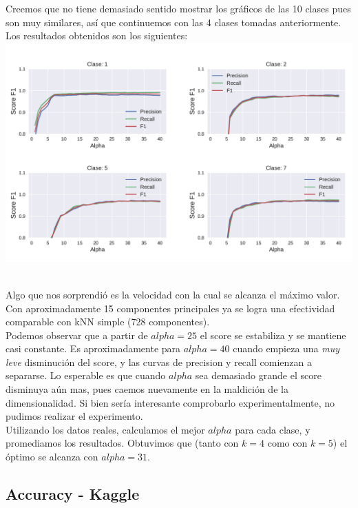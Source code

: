 Creemos que no tiene demasiado sentido mostrar los gráficos de las 10 clases pues son muy similares, así que continuemos con las 4 clases tomadas anteriormente. Los resultados obtenidos son los siguientes: \\

{\centering
    \includegraphics[scale=0.65]{informe/imagenes/pca/variacionAlphaClases1257KFijo.pdf} \\
}
$ $\newline

Algo que nos sorprendió es la velocidad con la cual se alcanza el máximo valor. Con aproximadamente 15 componentes principales ya se logra una efectividad comparable con kNN simple (728 componentes). \\

Podemos observar que a partir de $alpha=25$ el score se estabiliza y se mantiene casi constante. Es aproximadamente para $alpha=40$ cuando empieza una \textit{muy leve} disminución del score, y las curvas de precision y recall comienzan a separarse. Lo esperable es que cuando $alpha$ sea demasiado grande el score disminuya aún mas, pues caemos nuevamente en la maldición de la dimensionalidad. Si bien sería interesante comprobarlo experimentalmente, no pudimos realizar el experimento. \\

Utilizando los datos reales, calculamos el mejor $alpha$ para cada clase, y promediamos los resultados. Obtuvimos que (tanto con $k=4$ como con $k=5$) el óptimo se alcanza con $alpha=31$. \\


\subsection{Accuracy - Kaggle}

